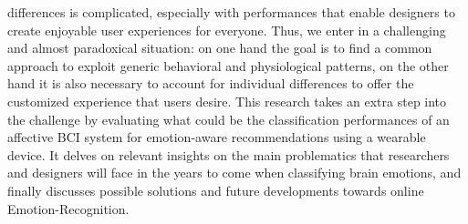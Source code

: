 differences is complicated, especially with performances that enable designers to create enjoyable user experiences for everyone. Thus, we enter in a challenging and almost paradoxical situation: on one hand the goal is to find a common approach to exploit generic behavioral and physiological patterns, on the other hand it is also necessary to account for individual differences to offer the customized experience that users desire. This research takes an extra step into the challenge by evaluating what could be the classification performances of an affective BCI system for emotion-aware recommendations using a wearable device. It delves on relevant insights on the main problematics that researchers and designers will face in the years to come when classifying brain emotions, and finally discusses possible solutions and future developments towards online Emotion-Recognition.

